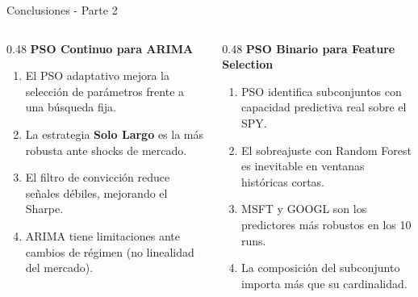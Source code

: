 \documentclass[aspectratio=169]{beamer}
\begin{document}
\begin{frame}{Conclusiones - Parte 2}
  \begin{columns}[T]
    \begin{column}{0.48\textwidth}
      \textbf{PSO Continuo para ARIMA}
      \begin{enumerate}
        \item El PSO adaptativo mejora la selección de
              parámetros frente a una búsqueda fija.
        \item La estrategia \textbf{Solo Largo} es la más
              robusta ante shocks de mercado.
        \item El filtro de convicción reduce señales
              débiles, mejorando el Sharpe.
        \item ARIMA tiene limitaciones ante cambios de
              régimen (no linealidad del mercado).
      \end{enumerate}
    \end{column}
    \begin{column}{0.48\textwidth}
      \textbf{PSO Binario para Feature Selection}
      \begin{enumerate}
        \item PSO identifica subconjuntos con capacidad
              predictiva real sobre el SPY.
        \item El sobreajuste con Random Forest es inevitable
              en ventanas históricas cortas.
        \item MSFT y GOOGL son los predictores más robustos
              en los 10 runs.
        \item La composición del subconjunto importa más
              que su cardinalidad.
      \end{enumerate}
    \end{column}
  \end{columns}

  \vspace{8pt}
\end{frame}
\end{document}
